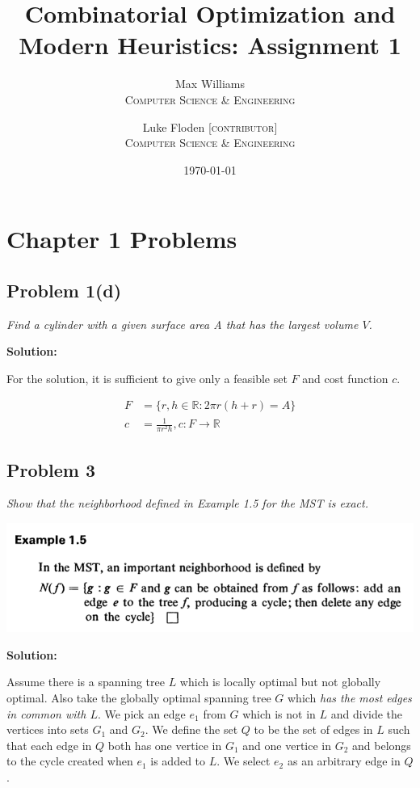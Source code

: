 \documentclass[11pt, a4paper]{article}
\title{Combinatorial Optimization and Modern Heuristics: Assignment 1}
\author{
	Max Williams\\
    \textsc{Computer Science \& Engineering}\\
	\and 
    Luke Floden [\textsc{contributor}]\\
    \textsc{Computer Science \& Engineering}\\
	}
\date{\today}
\newcommand{\solution}{ \noindent \textbf{Solution:}}
\newcommand{\problem}[1]{\textit{#1} \medskip}
\begin{document}
\maketitle


\section*{Chapter 1 Problems}

\subsection*{Problem 1(d)}

\problem{Find a cylinder with a given surface area A that has the largest volume $V$.}

\solution

For the solution, it is sufficient to give only a feasible set $F$ and cost function $c$.

\begin{align}
    F &= \{r,h\in \mathbb{R}: 2\pi r(h+r)=A\}\\
    c &= \frac{1}{\pi r^2 h}, c:F\to \mathbb{R}
\end{align}


\subsection*{Problem 3}

\problem{Show that the neighborhood defined in Example 1.5 for the MST is exact.}

\includegraphics[scale=0.4]{ex15}

\solution

\newcommand{\len}{\text{len}}

Assume there is a spanning tree $L$ which is locally optimal but not globally optimal. Also take the
globally optimal spanning tree $G$ which \emph{has the most edges in common with $L$}. We pick an
edge $e_1$ from $G$ which is not in $L$ and divide the vertices into sets $G_1$ and $G_2$. 
We define the set $Q$ to be the set of edges in $L$ such that each edge in $Q$ both has one vertice
in $G_1$ and one vertice in $G_2$ and belongs to the cycle created when $e_1$ is added to $L$. We
select $e_2$ as an arbitrary edge in $Q$.
\end{document}
